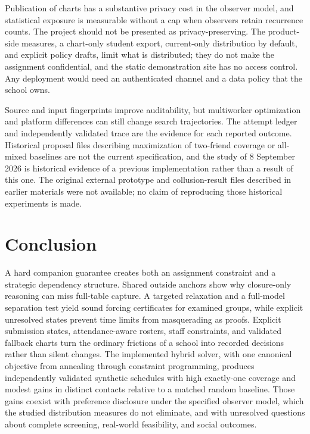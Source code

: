 \documentclass[11pt,a4paper]{article}
\theoremstyle{definition}\newtheorem{definition}[theorem]{Definition}
\theoremstyle{remark}\newtheorem{remark}[theorem]{Remark}
\begin{document}
Publication of charts has a substantive privacy cost in the observer model, and statistical exposure is measurable without a cap when observers retain recurrence counts. The project should not be presented as privacy-preserving. The product-side measures, a chart-only student export, current-only distribution by default, and explicit policy drafts, limit what is distributed; they do not make the assignment confidential, and the static demonstration site has no access control. Any deployment would need an authenticated channel and a data policy that the school owns.

Source and input fingerprints improve auditability, but multiworker optimization and platform differences can still change search trajectories. The attempt ledger and independently validated trace are the evidence for each reported outcome. Historical proposal files describing maximization of two-friend coverage or all-mixed baselines are not the current specification, and the study of 8 September 2026 is historical evidence of a previous implementation rather than a result of this one. The original external prototype and collusion-result files described in earlier materials were not available; no claim of reproducing those historical experiments is made.

\section{Conclusion}
A hard companion guarantee creates both an assignment constraint and a strategic dependency structure. Shared outside anchors show why closure-only reasoning can miss full-table capture. A targeted relaxation and a full-model separation test yield sound forcing certificates for examined groups, while explicit unresolved states prevent time limits from masquerading as proofs. Explicit submission states, attendance-aware rosters, staff constraints, and validated fallback charts turn the ordinary frictions of a school into recorded decisions rather than silent changes. The implemented hybrid solver, with one canonical objective from annealing through constraint programming, produces independently validated synthetic schedules with high exactly-one coverage and modest gains in distinct contacts relative to a matched random baseline. Those gains coexist with preference disclosure under the specified observer model, which the studied distribution measures do not eliminate, and with unresolved questions about complete screening, real-world feasibility, and social outcomes.
\end{document}
